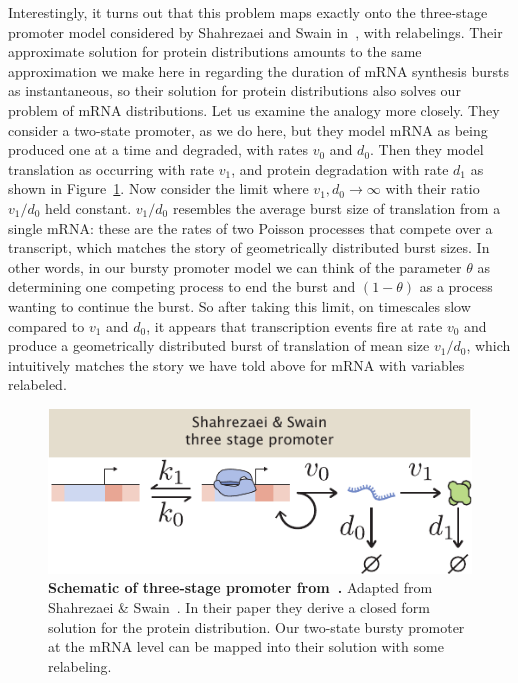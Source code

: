 Interestingly, it turns out that this problem maps exactly onto the three-stage
promoter model considered by Shahrezaei and Swain in~\cite{Shahrezaei2008}, with
relabelings. Their approximate solution for protein distributions amounts to the
same approximation we make here in regarding the duration of mRNA synthesis
bursts as instantaneous, so their solution for protein distributions also solves
our problem of mRNA distributions. Let us examine the analogy more closely. They
consider a two-state promoter, as we do here, but they model mRNA as being
produced one at a time and degraded, with rates $v_0$ and $d_0$. Then they model
translation as occurring with rate $v_1$, and protein degradation with rate
$d_1$ as shown in Figure~\ref{fig:shahrezaei}. Now consider the limit where
$v_1, d_0\rightarrow\infty$ with their ratio $v_1/d_0$ held constant. $v_1/d_0$
resembles the average burst size of translation from a single mRNA: these are
the rates of two Poisson processes that compete over a transcript, which matches
the story of geometrically distributed burst sizes. In other words, in our 
bursty promoter model we can think of the parameter $\theta$ as determining one
competing process to end the burst and $(1 - \theta)$ as a process wanting to
continue the burst. So after taking this limit, on timescales slow compared to
$v_1$ and $d_0$, it appears that transcription events fire at rate $v_0$ and
produce a geometrically distributed burst of translation of mean size $v_1/d_0$,
which intuitively matches the story we have told above for mRNA with variables
relabeled.

\begin{figure}
\centering
\includegraphics{../figures/si/figS0X_Shahrezaei_promoter.pdf}
\caption{\textbf{Schematic of three-stage promoter from~\cite{Shahrezaei2008}.}
Adapted from Shahrezaei \& Swain~\cite{Shahrezaei2008}. In their paper they
derive a closed form solution for the protein distribution. Our two-state bursty
promoter at the mRNA level can be mapped into their solution with some
relabeling.}
\label{fig:shahrezaei}
\end{figure}

